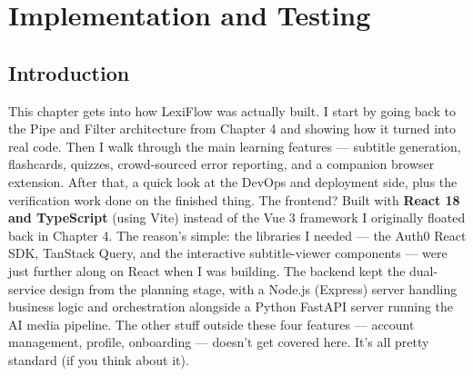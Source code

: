 \chapter{Implementation and Testing}\label{chap:implementation}

\section{Introduction}This chapter gets into how LexiFlow was actually built. I start by going back to the Pipe and Filter architecture from Chapter 4 and showing how it turned into real code. Then I walk through the main learning features --- subtitle generation, flashcards, quizzes, crowd-sourced error reporting, and a companion browser extension. After that, a quick look at the DevOps and deployment side, plus the verification work done on the finished thing. The frontend? Built with \textbf{React 18 and TypeScript} (using Vite) instead of the Vue 3 framework I originally floated back in Chapter 4. The reason's simple: the libraries I needed --- the Auth0 React SDK, TanStack Query, and the interactive subtitle-viewer components --- were just further along on React when I was building. The backend kept the dual-service design from the planning stage, with a Node.js (Express) server handling business logic and orchestration alongside a Python FastAPI server running the AI media pipeline. The other stuff outside these four features --- account management, profile, onboarding --- doesn't get covered here. It's all pretty standard (if you think about it).
